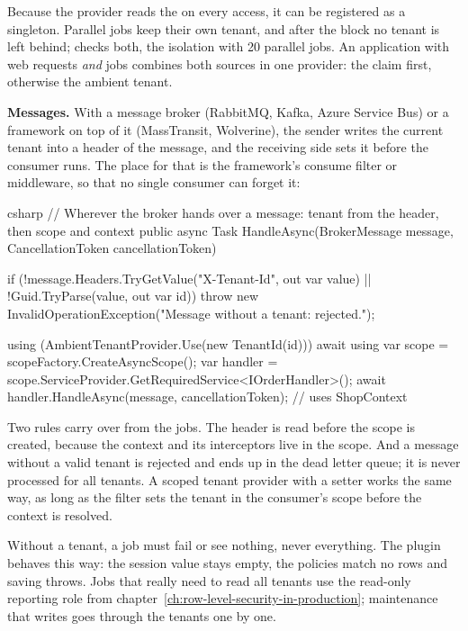 Because the provider reads the  on every access, it can be
registered as a singleton. Parallel jobs keep their own tenant, and after the 
block no tenant is left behind; 
checks both, the isolation with 20 parallel jobs. An application with web requests \emph{and} jobs combines
both sources in one provider: the claim first, otherwise the ambient tenant.

\textbf{Messages.} With a message broker (RabbitMQ, Kafka, Azure Service Bus) or a framework on
top of it (MassTransit, Wolverine), the sender writes the current tenant into a header of the
message, and the receiving side sets it before the consumer runs. The place for that is the
framework's consume filter or middleware, so that no single consumer can forget it:

\begin{sourcecode}{csharp}
// Wherever the broker hands over a message: tenant from the header, then scope and context
public async Task HandleAsync(BrokerMessage message, CancellationToken cancellationToken)
{
    if (!message.Headers.TryGetValue("X-Tenant-Id", out var value)
        || !Guid.TryParse(value, out var id))
        throw new InvalidOperationException("Message without a tenant: rejected.");

    using (AmbientTenantProvider.Use(new TenantId(id)))
    {
        await using var scope = scopeFactory.CreateAsyncScope();
        var handler = scope.ServiceProvider.GetRequiredService<IOrderHandler>();
        await handler.HandleAsync(message, cancellationToken);   // uses ShopContext
    }
}
\end{sourcecode}

Two rules carry over from the jobs. The header is read before the scope is created, because
the context and its interceptors live in the scope. And a message without a valid tenant is
rejected and ends up in the dead letter queue; it is never processed for all tenants. A scoped
tenant provider with a setter works the same way, as long as the filter sets the tenant in the
consumer's scope before the context is resolved.

\begin{important}
  Without a tenant, a job must fail or see nothing, never everything. The plugin behaves
  this way: the session value stays empty, the policies match no rows and saving throws.
  Jobs that really need to read all tenants use the read-only reporting
  role from chapter~\ref{ch:row-level-security-in-production}; maintenance that writes goes
  through the tenants one by one.
\end{important}

